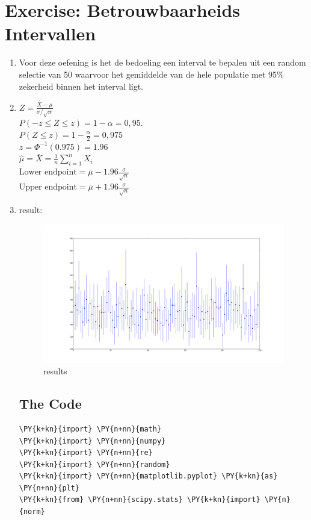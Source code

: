 \documentclass[pdftex,12pt,a4paper]{article}
\begin{document}
\section{Exercise: Betrouwbaarheids Intervallen}
    \begin{enumerate}
        \item
            Voor deze oefening is het de bedoeling een interval te bepalen uit een random selectie van 50 waarvoor het gemiddelde van de hele populatie met 95\% zekerheid binnen het interval ligt.
        \item

            $Z = \frac {\bar X-\mu}{\sigma/\sqrt{n}}$\\
            $P(-z\le Z\le z) = 1-\alpha = 0,95.$\\
            $P(Z \le z) = 1 - \frac{\alpha}2 = 0{,}975$\\
            $z = \Phi^{-1}(0.975) = 1.96$\\

            $\hat \mu=\bar X = \frac{1}{n}\sum_{i=1}^n X_i$\\
            $\text{Lower endpoint} = \bar\mu - 1.96 \frac{\sigma}{\sqrt{n}}$\\
            $\text{Upper endpoint} = \bar\mu + 1.96 \frac{\sigma}{\sqrt{n}}$
        \item
            result:
            \begin{figure}[H]
                \centering
                \includegraphics[width=\linewidth]{figure_1.png}
                \caption{results}
                \label{fig:results}
            \end{figure}
    \subsection{The Code}
        \begin{Verbatim}[commandchars=\\\{\}]
\PY{k+kn}{import} \PY{n+nn}{math}
\PY{k+kn}{import} \PY{n+nn}{numpy}
\PY{k+kn}{import} \PY{n+nn}{re}
\PY{k+kn}{import} \PY{n+nn}{random}
\PY{k+kn}{import} \PY{n+nn}{matplotlib.pyplot} \PY{k+kn}{as} \PY{n+nn}{plt}
\PY{k+kn}{from} \PY{n+nn}{scipy.stats} \PY{k+kn}{import} \PY{n}{norm}



\end{Verbatim}
\end{enumerate}
\end{document}
